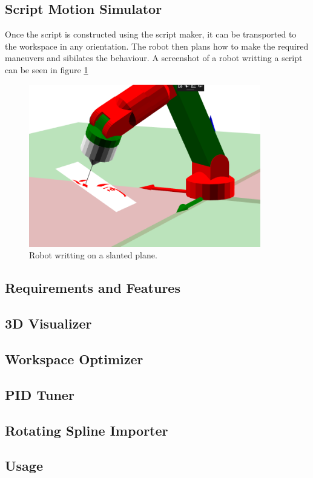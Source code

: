 {    \subsection{Script Motion Simulator}
    Once the script is constructed using the script maker, it can be transported to the workspace in any orientation. The robot then plans how to make the required maneuvers and sibilates the behaviour. A screenshot of a robot writting a script can be seen in figure \ref{FigScriptMotion}
        \begin{figure}
          \centering
          \includegraphics[width=0.9\textwidth]{writting.PNG}
          \caption{Robot writting on a slanted plane.
          } \label{FigScriptMotion}
        \end{figure}
}
\subsection{Requirements and Features}
\subsection{3D Visualizer}
\subsection{Workspace Optimizer}
\subsection{PID Tuner}
\subsection{Rotating Spline Importer}
\subsection{Usage}
